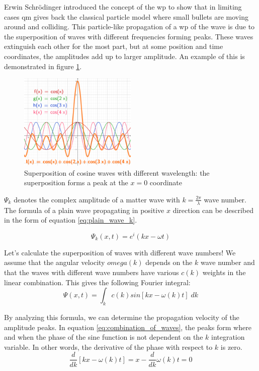 Erwin Schrödinger introduced the concept of the \acrfull{wp} to show that in limiting cases \acrshort{qm} gives back the classical particle model where small bullets are moving around and colliding.
This particle-like propagation of a \acrshort{wp} of the wave is due to the superposition of waves with different frequencies forming peaks.
These waves extinguish each other for the most part, but at some position and time coordinates, the amplitudes add up to larger amplitude.
An example of this is demonstrated in figure \ref{fig:superposition}.
\begin{figure}
	\centering
	\includegraphics[width=0.5\textwidth]{figures/Superposition of cosine waves.png}
	\caption{Superposition of cosine waves with different wavelength: the superposition forms a peak at the $x = 0$ coordinate}
	\label{fig:superposition}
\end{figure}

$\Psi_k$ denotes the complex amplitude of a matter wave with $k=\frac{2\pi}{\lambda}$ wave number. The formula of a plain wave propagating in positive $x$ direction can be described in the form of equation \ref{eq:plain_wave_k}.

\begin{equation}
	\label{eq:plain_wave_k}
	\Psi_k(x, t) = e^i(kx - \omega t)
\end{equation}

Let's calculate the superposition of waves with different wave numbers! We assume that the angular velocity $omega(k)$ depends on the $k$ wave number and that the waves with different wave numbers have various $c(k)$ weights in the linear combination. This gives the following Fourier integral:
\begin{equation}
	\label{eq:combination_of_waves}
	\Psi(x, t) = \int_k c(k) sin[kx - \omega(k)t]\; dk
\end{equation}

By analyzing this formula, we can determine the propagation velocity of the amplitude peaks.
In equation \ref{eq:combination_of_waves}, the peaks form where and when the phase of the sine function is not dependent on the $k$ integration variable. In other words, the derivative of the phase with respect to $k$ is zero.
\begin{equation}
	\label{eq:derivative_of_phase}
	\frac{d}{dk}[kx - \omega(k)t] = x - \frac{d}{dk}\omega(k)t = 0
\end{equation}

